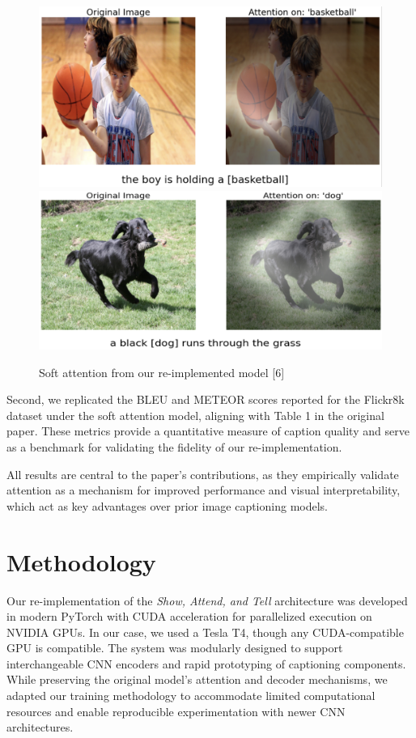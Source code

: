 \documentclass{article}
\begin{document}
\begin{figure}[h]
    \centering
    \includegraphics[width=0.35\linewidth]{example-boy.png}
    \includegraphics[width=0.4\linewidth]{example-dog.png}
    \caption{Soft attention from our re-implemented model [6]}
    \label{fig:results}
\end{figure}
Second, we replicated the BLEU and METEOR scores reported for the Flickr8k dataset under the soft attention model, aligning with Table 1 in the original paper. These metrics provide a quantitative measure of caption quality and serve as a benchmark for validating the fidelity of our re-implementation. 

All results are central to the paper’s contributions, as they empirically validate attention as a mechanism for improved performance and visual interpretability, which act as key advantages over prior image captioning models.

\section{Methodology}

Our re-implementation of the \textit{Show, Attend, and Tell} architecture was developed in modern PyTorch with CUDA acceleration for parallelized execution on NVIDIA GPUs. In our case, we used a Tesla T4, though any CUDA-compatible GPU is compatible. The system was modularly designed to support interchangeable CNN encoders and rapid prototyping of captioning components. While preserving the original model’s attention and decoder mechanisms, we adapted our training methodology to accommodate limited computational resources and enable reproducible experimentation with newer CNN architectures.
\end{document}
